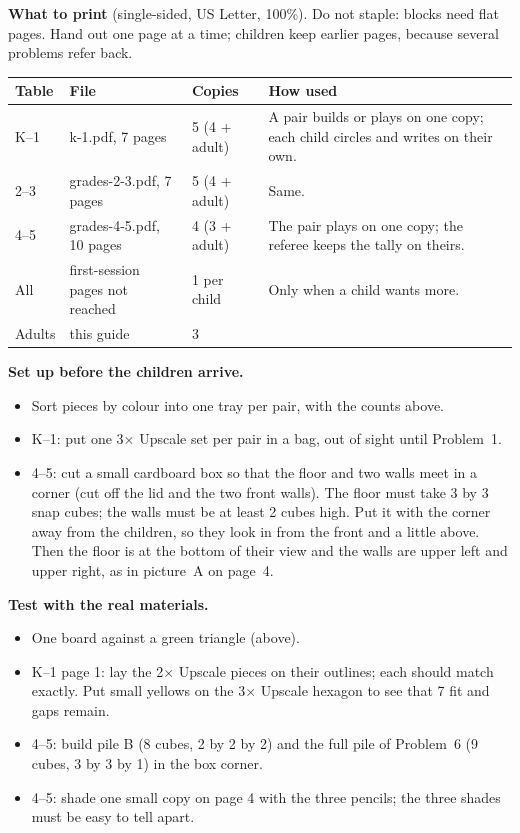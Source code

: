 \documentclass[10pt]{article}
\begin{document}
\textbf{What to print} (single-sided, US Letter, 100\%). Do not staple: blocks need flat pages. Hand out one page at a time; children keep earlier pages, because several problems refer back.

\begin{xltabular}{\linewidth}{L{0.8in} L{1.5in} L{1.1in} Y}
\toprule
Table & File & Copies & How used\\
\midrule
K--1 & k-1.pdf, 7 pages & 5 (4 + adult) & A pair builds or plays on one copy; each child circles and writes on their own.\\
2--3 & grades-2-3.pdf, 7 pages & 5 (4 + adult) & Same.\\
4--5 & grades-4-5.pdf, 10 pages & 4 (3 + adult) & The pair plays on one copy; the referee keeps the tally on theirs.\\
All & first-session pages not reached & 1 per child & Only when a child wants more.\\
Adults & this guide & 3 & \\
\bottomrule
\end{xltabular}

\textbf{Set up before the children arrive.}
\begin{itemize}
\item Sort pieces by colour into one tray per pair, with the counts above.
\item K--1: put one 3$\times$ Upscale set per pair in a bag, out of sight until Problem~1.
\item 4--5: cut a small cardboard box so that the floor and two walls meet in a corner (cut off the lid and the two front walls). The floor must take 3 by 3 snap cubes; the walls must be at least 2 cubes high. Put it with the corner away from the children, so they look in from the front and a little above. Then the floor is at the bottom of their view and the walls are upper left and upper right, as in picture~A on page~4.
\end{itemize}

\textbf{Test with the real materials.}
\begin{itemize}
\item One board against a green triangle (above).
\item K--1 page 1: lay the 2$\times$ Upscale pieces on their outlines; each should match exactly. Put small yellows on the 3$\times$ Upscale hexagon to see that 7 fit and gaps remain.
\item 4--5: build pile B (8 cubes, 2 by 2 by 2) and the full pile of Problem~6 (9 cubes, 3 by 3 by 1) in the box corner.
\item 4--5: shade one small copy on page 4 with the three pencils; the three shades must be easy to tell apart.
\end{itemize}
\end{document}
